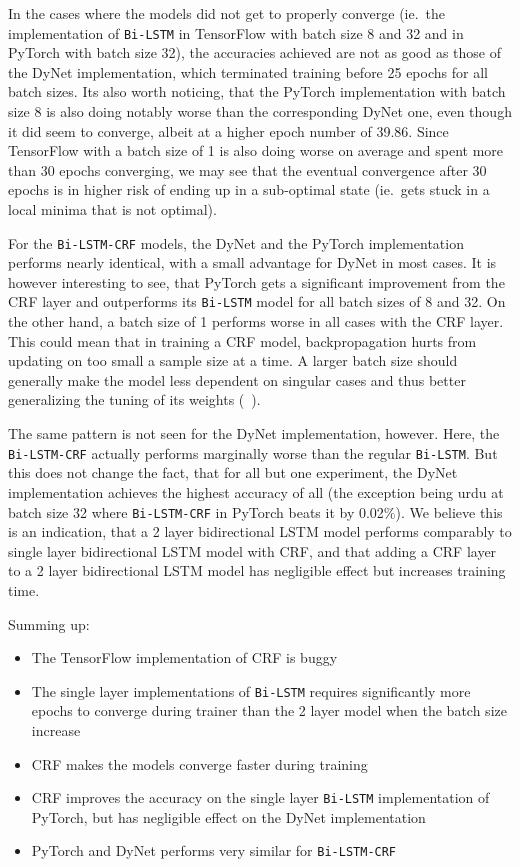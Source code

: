 In the cases where the models did not get to properly converge (ie.\ the
implementation of \texttt{Bi-LSTM} in TensorFlow with batch size 8 and 32 and in
PyTorch with batch size 32), the accuracies achieved are not as good as those of
the DyNet implementation, which terminated training before 25 epochs for
all batch sizes. Its also worth noticing, that the PyTorch implementation with
batch size 8 is also doing notably worse than the corresponding DyNet one, even
though it did seem to converge, albeit at a higher epoch number of 39.86. Since
TensorFlow with a batch size of 1 is also doing worse on average and spent more
than 30 epochs converging, we may see that the eventual convergence after 30
epochs is in higher risk of ending up in a sub-optimal state (ie.\ gets stuck in
a local minima that is not optimal).

For the \texttt{Bi-LSTM-CRF} models, the DyNet and the PyTorch implementation
performs nearly identical, with a small advantage for DyNet in most cases. It is
however interesting to see, that PyTorch gets a significant improvement from the
CRF layer and outperforms its \texttt{Bi-LSTM} model for all batch sizes of 8
and 32. On the other hand, a batch size of 1 performs worse in all cases with
the CRF layer. This could mean that in training a CRF model, backpropagation
hurts from updating on too small a sample size at a time. A larger batch size
should generally make the model less dependent on singular cases and thus better
generalizing the tuning of its weights (~\cite{falcon2018lstms}).

The same pattern is not seen for the DyNet implementation, however. Here, the
\texttt{Bi-LSTM-CRF} actually performs marginally worse than the regular
\texttt{Bi-LSTM}. But this does not change the fact, that for all but one
experiment, the DyNet implementation achieves the highest accuracy of all (the
exception being urdu at batch size 32 where \texttt{Bi-LSTM-CRF} in PyTorch
beats it by 0.02\%). We believe this is an indication, that a 2 layer
bidirectional LSTM model performs comparably to single layer bidirectional LSTM
model with CRF, and that adding a CRF layer to a 2 layer bidirectional LSTM
model has negligible effect but increases training time.

Summing up:

\begin{itemize}
    \item The TensorFlow implementation of CRF is buggy
    \item The single layer implementations of \texttt{Bi-LSTM} requires
        significantly more epochs to converge during trainer than the 2 layer
        model when the batch size increase
    \item CRF makes the models converge faster during training
    \item CRF improves the accuracy on the single layer \texttt{Bi-LSTM}
        implementation of PyTorch, but has negligible effect on the DyNet
        implementation
    \item PyTorch and DyNet performs very similar for \texttt{Bi-LSTM-CRF}
\end{itemize}




\pagebreak
